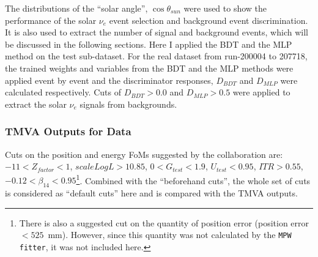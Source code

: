 The distributions of the ``solar angle'', $\cos\theta_{sun}$ were used to show the performance of the solar $\nu_e$ event selection and background event discrimination. It is also used to extract the number of signal and background events, which will be discussed in the following sections. Here I applied the BDT and the MLP method on the test sub-dataset. For the real dataset from run-200004 to 207718, the trained weights and variables from the BDT and the MLP methods were applied event by event and the discriminator responses, $D_{BDT}$ and $D_{MLP}$ were calculated respectively. Cuts of $D_{BDT}>0.0$ and $D_{MLP}>0.5$ were applied to extract the solar $\nu_e$ signals from backgrounds. 
 

%

\subsubsection{TMVA Outputs for Data}



Cuts on the position and energy FoMs suggested by the collaboration\cite{morganFOM} are: $-11<Z_{factor}<1$, $scaleLogL>10.85$, $0<G_{test}<1.9$, $U_{test}<0.95$, $ITR>0.55$, $-0.12<\beta_{14}<0.95$\footnote{There is also a suggested cut on the quantity of position error (position error$<525$~mm). However, since this quantity was not calculated by the \texttt{MPW fitter}, it was not included here.}. Combined with the ``beforehand cuts'', the whole set of cuts is considered as ``default cuts'' here and is compared with the TMVA outputs.

